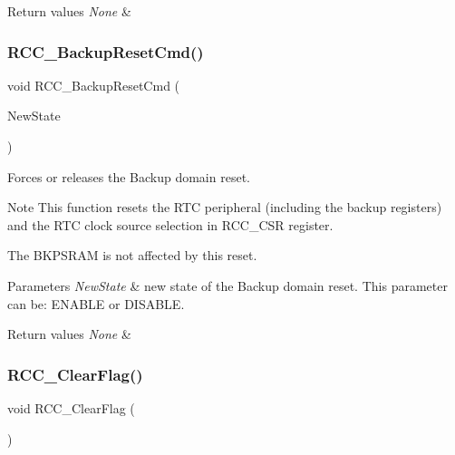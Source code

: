 \begin{DoxyRetVals}{Return values}
{\em None} & \\
\hline
\end{DoxyRetVals}
\mbox{\label{group___r_c_c_ga636c3b72f35391e67f12a551b15fa54a}} 
\subsubsection{\texorpdfstring{R\+C\+C\+\_\+\+Backup\+Reset\+Cmd()}{RCC\_BackupResetCmd()}}
{\footnotesize\ttfamily void R\+C\+C\+\_\+\+Backup\+Reset\+Cmd (\begin{DoxyParamCaption}\item[{Functional\+State}]{New\+State }\end{DoxyParamCaption})}



Forces or releases the Backup domain reset. 

\begin{DoxyNote}{Note}
This function resets the R\+TC peripheral (including the backup registers) and the R\+TC clock source selection in R\+C\+C\+\_\+\+C\+SR register. 

The B\+K\+P\+S\+R\+AM is not affected by this reset. ~\newline

\end{DoxyNote}

\begin{DoxyParams}{Parameters}
{\em New\+State} & new state of the Backup domain reset. This parameter can be\+: E\+N\+A\+B\+LE or D\+I\+S\+A\+B\+LE. \\
\hline
\end{DoxyParams}

\begin{DoxyRetVals}{Return values}
{\em None} & \\
\hline
\end{DoxyRetVals}
\mbox{\label{group___r_c_c_ga53f909dbb15a54124419084ebda97d72}} 
\subsubsection{\texorpdfstring{R\+C\+C\+\_\+\+Clear\+Flag()}{RCC\_ClearFlag()}}
{\footnotesize\ttfamily void R\+C\+C\+\_\+\+Clear\+Flag (\begin{DoxyParamCaption}\item[{void}]{ }\end{DoxyParamCaption})}



